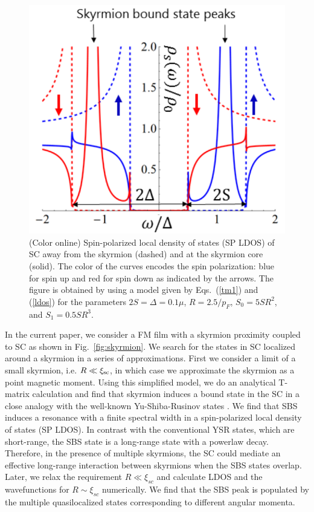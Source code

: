 \documentclass[twocolumn,showpacs,floatfix,longbibliography]{revtex4-1}
\begin{document}
\begin{figure} \centering
	\includegraphics[width=0.7\linewidth]{fig2} 
	\caption{(Color online) Spin-polarized local density of states (SP LDOS) of SC away from the skyrmion (dashed) and at the skyrmion core (solid). The color of the curves encodes the spin polarization: blue for spin up and red for spin down as indicated by the arrows. The figure is obtained by using a model given by Eqs.~(\ref{tm1}) and (\ref{ldos}) for the parameters $2S = \Delta = 0.1 \mu$, $R = 2.5/p_F$, $S_0 = 5SR^2$, and $S_1 = 0.5 SR^3$.} \label{fig:LDOS}
\end{figure}


In the current paper, we consider a FM film with a skyrmion proximity coupled to SC as shown in Fig.~\ref{fig:skyrmion}. We search for the states in SC localized around a skyrmion in a series of approximations. First we consider a limit of a small skyrmion, i.e. $R\ll \xi_{\rm sc}$, in which case we approximate the skyrmion as a point magnetic moment. Using this simplified model, we do an analytical T-matrix calculation and find that skyrmion induces a bound state in the SC in a close analogy with the well-known Yu-Shiba-Rusinov states \cite{Yu,Shiba,Rusinov,Balatsky2006}. We find that SBS induces a resonance with a finite spectral width in a spin-polarized local density of states (SP LDOS). In contrast with the conventional YSR states, which are short-range, the SBS state is a long-range state with a powerlaw decay. Therefore, in the presence of multiple skyrmions, the SC could mediate an effective long-range interaction between skyrmions \cite{Yao2014,Shytov2009} when the SBS states overlap. Later, we relax the requirement $R\ll \xi_{sc}$ and calculate LDOS and the wavefunctions for $R\sim \xi_{sc}$ numerically. We find that the SBS peak is populated by the multiple quasilocalized states corresponding to different angular momenta. 
\end{document}
